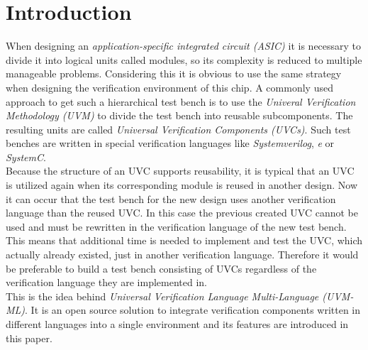 \section{Introduction}\label{introduction}
When designing an \emph{application-specific integrated circuit (ASIC)} it is
necessary to divide it into logical units called modules, so its complexity is
reduced to multiple manageable problems. Considering this it is obvious to use the same
strategy when designing the verification environment of this chip. A commonly
used approach to get such a hierarchical test bench is to use the \emph{Univeral
Verification Methodology (UVM)} to divide the test bench into reusable
subcomponents. The resulting units are called \emph{Universal Verification
Components (UVCs)}. Such test benches are written in special verification
languages like \emph{Systemverilog}, \emph{e} or \emph{SystemC}.\\
Because the structure of an UVC supports reusability, it is typical that an UVC
is utilized again when its corresponding module is reused in another design. Now
it can occur that the test bench for the new design uses another verification
language than the reused UVC. In this case the previous created UVC cannot be
used and must be rewritten in the verification language of the new test bench.
This means that additional time is needed to implement and test the UVC, which
actually already existed, just in another verification language. Therefore it
would be preferable to build a test bench consisting of UVCs regardless of the
verification language they are implemented in.\\
This is the idea behind  \emph{Universal Verification Language
Multi-Language (UVM-ML)}. It is an open source solution to integrate
verification components written in different languages into a single
environment and its features are introduced in this paper.



